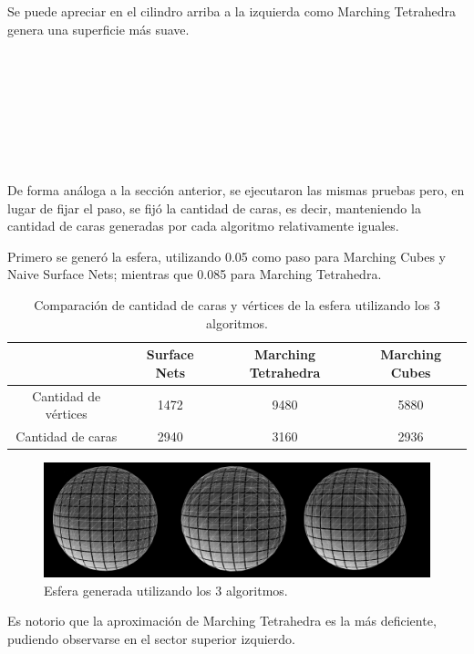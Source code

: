 \documentclass[12pt]{article}
\begin{document}
Se puede apreciar en el cilindro arriba a la izquierda como Marching Tetrahedra genera una superficie más suave.
\\\\\\\\\\\\\\\\\\

De forma análoga a la sección anterior, se ejecutaron las mismas pruebas pero, en lugar de fijar el paso, se fijó la cantidad de caras, es decir, manteniendo la cantidad de caras generadas por cada algoritmo relativamente iguales.

Primero se generó la esfera, utilizando 0.05 como paso para Marching Cubes y Naive Surface Nets; mientras que 0.085 para Marching Tetrahedra.
\begin{table}[h!]
  \centering
  \label{tab:table1}
  \begin{tabular}{cccc}
    \toprule
    & Surface Nets & Marching Tetrahedra & Marching Cubes\\
    \midrule
    Cantidad de vértices & 1472 & 9480  & 5880 \\
    Cantidad de caras &  2940 & 3160 & 2936 \\
    \bottomrule
  \end{tabular}
  \caption{Comparación de cantidad de caras y vértices de la esfera utilizando los 3 algoritmos.}
\end{table}
\begin{figure}[h!]
\includegraphics[width=\linewidth,center]{esfera2.png}
\caption{Esfera generada utilizando los 3 algoritmos.}
\end{figure}

Es notorio que la aproximación de Marching Tetrahedra es la más deficiente, pudiendo observarse en el sector superior izquierdo.
\end{document}
